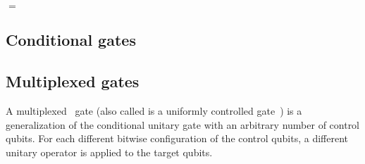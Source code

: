 \begin{center}
$=$
\end{center}


\subsection{Conditional gates}
\label{conditional_gates}

\subsection{Multiplexed gates}
A multiplexed~\cite{???,???,???} gate (also called is a uniformly controlled gate~\cite{???,???}) is a generalization of the conditional unitary gate with an arbitrary number of control qubits. For each different bitwise configuration of the control qubits, a different unitary operator is applied to the target qubits.


